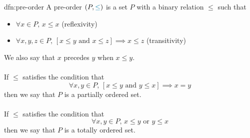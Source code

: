 \begin{dfn}{dfn:pre-order}
    A \textcolor{dfn-color}{pre-order} \( (P, \textcolor{dfn-color}{\leq}) \) is a set \( P \) with a binary relation \( \leq \) such that
    \begin{itemize}
        \item \( \forall x \in P, \, x \leq x \) (reflexivity)
        \item \( \forall x, y, z \in P, \, [x \leq y \text{ and } x \leq z] \implies x \leq z \) (transitivity)
    \end{itemize}
    We also say that \( x \) \textcolor{dfn-color}{precedes} \( y \) when \( x \leq y \).
    \\ \\
    If \( \leq \) satisfies the condition that
    \[
        \forall x, y \in P, \, [x \leq y \text{ and } y \leq x] \implies x = y
    \]
    then we say that \( P \) is a \textcolor{dfn-color}{partially ordered set}.
    \\ \\
    If \( \leq \) satisfies the condition that
    \[
        \forall x, y \in P, \, x \leq y \text{ or } y \leq x
    \]
    then we say that \( P \) is a \textcolor{dfn-color}{totally ordered set}.
\end{dfn}


